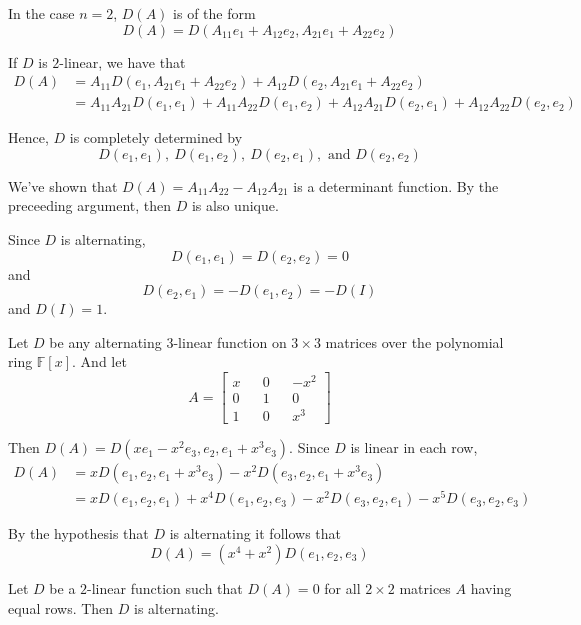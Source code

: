 In the case $n=2$, $D(A)$ is of the form
\[
	D(A) = D(A_{11}e_1 + A_{12}e_2, A_{21}e_1 + A_{22}e_2)
\]

If $D$ is $2$-linear, we have that
\begin{equation*}
	\begin{aligned}
		D(A) &= A_{11}D(e_1, A_{21}e_1 + A_{22}e_2) + A_{12}D(e_2, A_{21}e_1 + A_{22}e_2) \\
		&= A_{11} A_{21} D(e_1, e_1) + A_{11} A_{22} D(e_1, e_2) + A_{12} A_{21} D(e_2, e_1) + A_{12} A_{22} D(e_2, e_2)
	\end{aligned}
\end{equation*}

Hence, $D$ is completely determined by
\[
	D(e_1, e_1), ~D(e_1, e_2), ~D(e_2, e_1), \text{ and } D(e_2, e_2)
\]

We've shown that $D(A) = A_{11}A_{22} - A_{12}A_{21}$ is a determinant function. By the preceeding argument, then $D$ is also unique.

Since $D$ is alternating, 
\[
	D(e_1, e_1) = D(e_2, e_2) = 0
\]
and
\[
	D(e_2, e_1) = - D(e_1, e_2) = -D(I)
\]
and $D(I) = 1$.

\begin{example}
	Let $D$ be any alternating $3$-linear function on $3 \times 3$ matrices over the polynomial ring $\mathbb{F}[x]$. And let
	\[
		A = \begin{bmatrix}
			x && 0 && -x^2 \\
			0 && 1 && 0 \\
			1 && 0 && x^3
		\end{bmatrix}
	\]

	Then $D(A) = D(xe_1 - x^2 e_3, e_2, e_1 + x^3e_3)$. Since $D$ is linear in each row,
	\begin{equation*}
		\begin{aligned}
		D(A) &= xD(e_1, e_2, e_1 + x^3 e_3) - x^2D(e_3, e_2, e_1 + x^3 e_3) \\
		&= xD(e_1, e_2, e_1) + x^4D(e_1, e_2, e_3) - x^2D(e_3, e_2, e_1) - x^5D(e_3, e_2, e_3)
		\end{aligned}
	\end{equation*}

	By the hypothesis that $D$ is alternating it follows that
	\[
		D(A) = (x^4 + x^2)D(e_1, e_2, e_3)
	\]
\end{example}

\begin{lemma}
	Let $D$ be a $2$-linear function such that $D(A) = 0$ for all $2 \times 2$ matrices $A$ having equal rows. Then $D$ is alternating.
\end{lemma}

